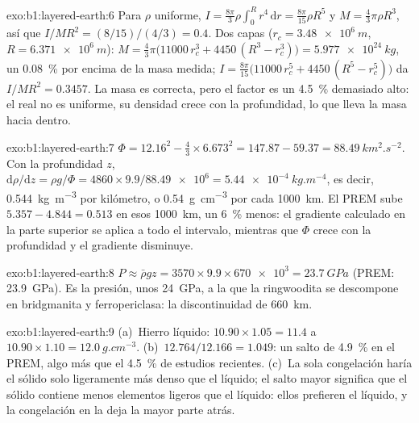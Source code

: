 \begin{solution}{exo:b1:layered-earth:6}
Para $\rho$ uniforme, $I = \tfrac{8\pi}{3}\rho\int_0^R r^4\,\mathrm dr =
\tfrac{8\pi}{15}\rho R^5$ y $M = \tfrac43\pi\rho R^3$, así que
$I/MR^2 = (8/15)/(4/3) = 0.4$. Dos capas ($r_c = \qty{3.48e6}{m}$,
$R = \qty{6.371e6}{m}$): $M = \tfrac43\pi\bigl(11000\,r_c^3 + 4450\,(R^3 -
r_c^3)\bigr) = \qty{5.977e24}{kg}$, un \qty{0.08}{\percent} por encima de la masa medida; $I = \tfrac{8\pi}{15}\bigl(11000\,r_c^5 + 4450\,(R^5 - r_c^5)\bigr)$ da $I/MR^2 = 0.3457$. La masa es correcta, pero el factor es un \qty{4.5}{\percent} demasiado alto: el 
real no es uniforme, su densidad crece con la profundidad, lo que lleva la masa hacia dentro.
\end{solution}

\begin{solution}{exo:b1:layered-earth:7}
$\Phi = 12.16^2 - \tfrac43\times6.673^2 = 147.87 - 59.37 =
\qty{88.49}{km^2.s^{-2}}$. Con la profundidad $z$,
$\mathrm d\rho/\mathrm dz = \rho g/\Phi = 4860\times9.9/\num{88.49e6} =
\qty{5.44e-4}{kg.m^{-4}}$, es decir, \qty{0.544}{kg.m^{-3}} por kilómetro, o
\qty{0.54}{g.cm^{-3}} por cada \qty{1000}{km}. El PREM sube $5.357 - 4.844 =
0.513$ en esos \qty{1000}{km}, un \qty{6}{\percent} menos: el gradiente calculado en la parte superior se aplica a todo el
intervalo, mientras que $\Phi$ crece con la profundidad y el gradiente disminuye.
\end{solution}

\begin{solution}{exo:b1:layered-earth:8}
$P \approx \bar\rho g z = 3570\times9.9\times\num{670e3} = \qty{23.7}{GPa}$ (PREM: \qty{23.9}{GPa}). Es la presión, unos
\qty{24}{GPa}, a la que la ringwoodita se descompone en bridgmanita y ferropericlasa: la discontinuidad de \qty{660}{km}.
\end{solution}

\begin{solution}{exo:b1:layered-earth:9}
(a)~Hierro líquido: $10.90\times1.05 = 11.4$ a $10.90\times1.10 =
\qty{12.0}{g.cm^{-3}}$. (b)~$12.764/12.166 = 1.049$: un
salto de \qty{4.9}{\percent} en el PREM, algo más que el \qty{4.5}{\percent} de estudios recientes. (c)~La sola congelación
haría el sólido solo ligeramente más denso que el líquido; el salto mayor significa que el sólido contiene menos elementos
ligeros que el líquido: ellos prefieren el líquido, y la congelación en la  deja la mayor parte atrás.
\end{solution}

